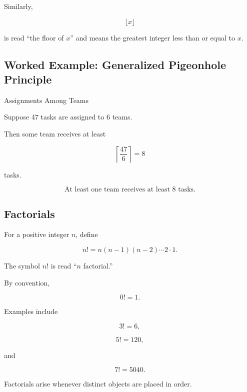 Similarly,

\[
\lfloor x\rfloor
\]

is read ``the floor of \(x\)'' and means the greatest integer less than
or equal to \(x\).

\subsection{Worked Example: Generalized Pigeonhole Principle}
\label{subsec:worked-generalized-pigeonhole}

\begin{workedexamplebox}{Assignments Among Teams}

Suppose \(47\) tasks are assigned to \(6\) teams.

Then some team receives at least

\[
\left\lceil
\frac{47}{6}
\right\rceil
=
8
\]

tasks.

\begin{answerbox}
\[
\boxed{
\text{At least one team receives at least }8\text{ tasks.}
}
\]
\end{answerbox}

\end{workedexamplebox}

\subsection{Factorials}
\label{subsec:factorials}

For a positive integer \(n\), define

\[
\boxed{
n!
=
n(n-1)(n-2)\cdots2\cdot1.
}
\]

The symbol \(n!\) is read ``\(n\) factorial.''

By convention,

\[
\boxed{
0!=1.
}
\]

Examples include

\[
3!=6,
\]

\[
5!=120,
\]

and

\[
7!=5040.
\]

Factorials arise whenever distinct objects are placed in order.

